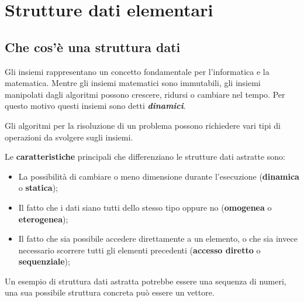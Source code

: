 \chapter{Strutture dati elementari}

\section{Che cos'è una struttura dati}
Gli insiemi rappresentano un concetto fondamentale per l'informatica e la matematica. Mentre gli insiemi matematici sono immutabili, gli insiemi manipolati dagli algoritmi possono crescere, ridursi o cambiare nel tempo. Per questo motivo questi insiemi sono detti \textit{\textbf{dinamici}}.

 Gli algoritmi per la risoluzione di un problema possono richiedere vari tipi di operazioni da svolgere sugli insiemi.


Le \textbf{caratteristiche} principali che differenziano le strutture dati astratte sono:
\begin{itemize}
	\item La possibilità di cambiare o meno dimensione durante l'esecuzione (\textbf{dinamica} o \textbf{statica});
	\item Il fatto che i dati siano tutti dello stesso tipo oppure no (\textbf{omogenea} o \textbf{eterogenea});
	\item Il fatto che sia possibile accedere direttamente a un elemento, o che sia invece necessario scorrere tutti gli elementi precedenti (\textbf{accesso diretto} o \textbf{sequenziale});
\end{itemize}


\begin{example}
Un esempio di struttura dati astratta potrebbe essere una sequenza di numeri, una sua possibile struttura concreta può essere un vettore.
\end{example}

